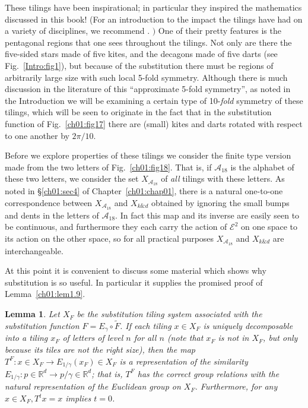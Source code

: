 \documentclass[reqno]{stml-l}
\theoremstyle{plain}
\newtheorem{lemma}[theorem]{Lemma}
\theoremstyle{definition}
\numberwithin{equation}{chapter}
\begin{document}
These tilings have been inspirational; in particular they
inspired the mathematics discussed in this book! (For an
introduction to the impact the tilings have had on a
variety of disciplines, we recommend \cite{bib:Sen}. $)$
One of their pretty features is the pentagonal regions that
one sees throughout the tilings. Not only are there the
five-sided stars made of five kites, and the decagons made
of five darts (see Fig.~\ref{Intro:fig1}), but because of
the substitution there must be regions of arbitrarily large
size with such local 5-fold
symmetry.
Although there is much discussion in the literature of this
``approximate 5-fold symmetry'', as noted in the
Introduction we will be examining a certain type of
10-\emph{fold} symmetry of
these tilings, which will be seen to originate in the fact
that in the substitution function of Fig.~\ref{ch01:fig17}
there are (small) kites and darts rotated with respect to
one another by $2\pi/10$.

Before we explore properties of these tilings we consider
the finite type version made from the two letters of
Fig.~\ref{ch01:fig18}. That is, if $\mathcal{A}_{18}$ is
the alphabet of these two letters, we consider the set
$X_{\mathcal{A}_{18}}$ of \emph{all} tilings with these
letters. As noted in \S \ref{ch01:sec4} of Chapter~\ref{ch01:chap01},
there is a natural one-to-one correspondence between
$X_{\mathcal{A}_{18}}$ and $X_{k\& d}$ obtained by ignoring
the small bumps and dents in the letters of
$\mathcal{A}_{18}$. In fact this map and its inverse are
easily seen to be continuous, and furthermore they each
carry the action of $\mathcal{E}^{2}$ on one space to its
action on the other space, so for all practical purposes
$X_{\mathcal{A}_{18}}$ and $X_{k\& d}$ are interchangeable.

At this point it is convenient to discuss some material which shows why substitution is so useful. In particular it supplies the promised proof of Lemma~\ref{ch01:lem1.9}.

\begin{lemma}\label{ch04:lem4.1}
Let $X_{F}$ be the substitution tiling system associated with the substitution function $F=E_{\gamma}\circ\tilde{F}$. If each tiling $x\in X_{F}$ is uniquely decomposable into a tiling $x_{F}$ of letters of level $n$ for all $n$ (note that $x_{F}$ is not in $X_{F}$, but only because its tiles are not the right size), then the map $T^{F}:x\in X_{F}\rightarrow E_{1/\gamma}(x_{F})\in X_{F}$ is a representation of the similarity $E_{1/\gamma}:p\in \mathbb{R}^{d}\rightarrow p/\gamma\in \mathbb{R}^{d}$; that is, $T^{F}$ has the correct group relations with the natural representation of the Euclidean group on $X_{F}$. Furthermore, for any $x\in X_{F},T^{t}x=x$ implies $t=0$.
\end{lemma}
\end{document}
